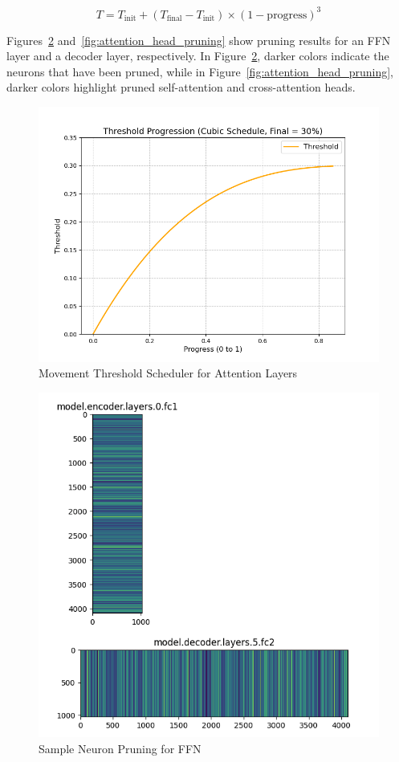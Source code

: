 \begin{equation}
T = T_{\text{init}} + (T_{\text{final}} - T_{\text{init}}) \times (1 - \text{progress})^3
\label{eq:threshold}
\end{equation}


Figures~\ref{fig:neuron_pruning} and~\ref{fig:attention_head_pruning} show pruning results for an FFN layer and a decoder layer, respectively.
In Figure~\ref{fig:neuron_pruning}, darker colors indicate the neurons that have been pruned,
while in Figure~\ref{fig:attention_head_pruning}, darker colors highlight pruned self-attention and cross-attention heads.

\begin{figure}[hbpt]
    \centering
    \includegraphics[width=0.9\linewidth]{images/1}
    \caption{Movement Threshold Scheduler for Attention Layers}
    \label{fig:sub3}
\end{figure}

\begin{figure}[h!]
    \centering
    \includegraphics[width=0.9\linewidth]{images/pruning1}
    \caption{Sample Neuron Pruning for FFN}
    \label{fig:neuron_pruning}
\end{figure}

